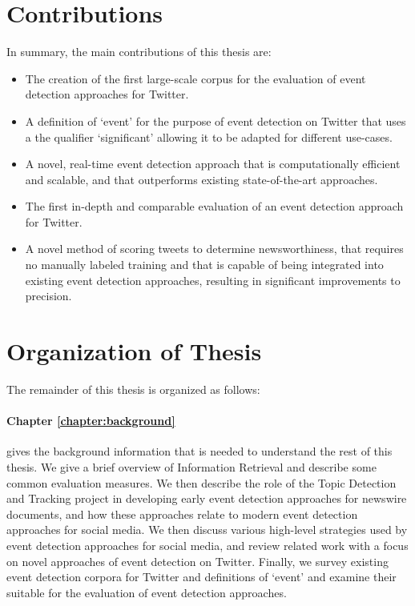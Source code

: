 \section{Contributions}
In summary, the main contributions of this thesis are:

\begin{itemize}
	\item The creation of the first large-scale corpus for the evaluation of event detection approaches for Twitter.

	\item A definition of `event' for the purpose of event detection on Twitter that uses a the qualifier `significant' allowing it to be adapted for different use-cases.

	\item A novel, real-time event detection approach that is computationally efficient and scalable, and that outperforms existing state-of-the-art approaches.

	\item The first in-depth and comparable evaluation of an event detection approach for Twitter.

	\item A novel method of scoring tweets to determine newsworthiness, that requires no manually labeled training and that is capable of being integrated into existing event detection approaches, resulting in significant improvements to precision.
\end{itemize}

\newpage
\section{Organization of Thesis}

The remainder of this thesis is organized as follows:

\paragraph{Chapter \ref{chapter:background}} gives the background information that is needed to understand the rest of this thesis.
We give a brief overview of Information Retrieval and describe some common evaluation measures.
We then describe the role of the Topic Detection and Tracking project in developing early event detection approaches for newswire documents, and how these approaches relate to modern event detection approaches for social media. We then discuss various high-level strategies used by event detection approaches for social media, and review related work with a focus on novel approaches of event detection on Twitter.
Finally, we survey existing event detection corpora for Twitter and definitions of `event' and examine their suitable for the evaluation of event detection approaches.

